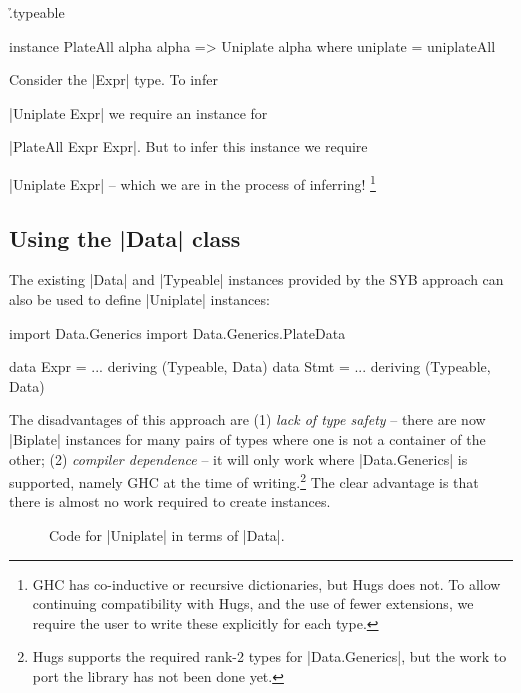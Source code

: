 \h{.typeable}\begin{code}
instance PlateAll alpha alpha => Uniplate alpha where
    uniplate = uniplateAll
\end{code}

Consider the |Expr| type. To infer \ignore|Uniplate Expr| we require an instance for \ignore|PlateAll Expr Expr|. But to infer this instance we require \ignore|Uniplate Expr| -- which we are in the process of inferring! \footnote{GHC has co-inductive or recursive dictionaries, but Hugs does not. To allow continuing compatibility with Hugs, and the use of fewer extensions, we require the user to write these explicitly for each type.}


\subsection{Using the |Data| class}
\label{secU:implement_playdata}

The existing |Data| and |Typeable| instances provided by the SYB approach can also be used to define |Uniplate| instances:

\ignore\begin{code}
import Data.Generics
import Data.Generics.PlateData

data Expr  = ... \? \? deriving (Typeable, Data)
data Stmt  = ... \? \? deriving (Typeable, Data)
\end{code}

The disadvantages of this approach are (1) \textit{lack of type safety} -- there are now |Biplate| instances for many pairs of types where one is not a container of the other; (2) \textit{compiler dependence} -- it will only work where |Data.Generics| is supported, namely GHC at the time of writing.\footnote{Hugs supports the required rank-2 types for |Data.Generics|, but the work to port the library has not been done yet.} The clear advantage is that there is almost no work required to create instances.

\begin{figure}
\ignore{}
\caption{Code for |Uniplate| in terms of |Data|.}
\label{figU:playdata}
\end{figure}


